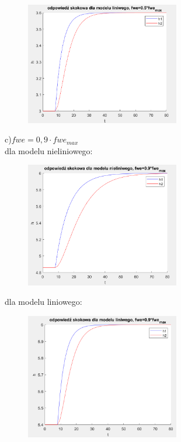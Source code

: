 \documentclass{article}
\begin{document}
\begin{figure}[h!]
    \centering
    \includegraphics[width=0.6\textwidth]{L05P.png}
    \label{fig:my_label}
\end{figure}
\begin{flushleft}
c)$fwe=0,9 \cdot fwe_{max}$ \\
dla modelu nieliniowego:
\end{flushleft}


 \begin{figure}[h!]
    \centering
    \includegraphics[width=0.6\textwidth]{NL09P.png}
    \label{fig:my_label}
\end{figure}
\newpage
\begin{flushleft}
dla modelu liniowego:
\end{flushleft}

\begin{figure}[h!]
    \centering
    \includegraphics[width=0.6\textwidth]{L09P.png}
    \label{fig:my_label}
\end{figure}
\end{document}
